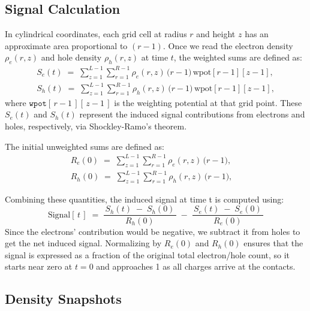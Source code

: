\subsection{Signal Calculation}
In cylindrical coordinates, each grid cell at radius $r$ and height $z$ has an approximate area proportional to $(r - 1)$. Once we read the electron 
density $\rho_e(r,z)$ and hole density $\rho_h(r,z)$ at time $t$, the weighted sums are defined as:
\begin{align}
S_e(t) \;=\; \sum_{z=1}^{L-1} \sum_{r=1}^{R-1}
   \rho_e(r,z)\,\bigl(r-1\bigr)\,\text{wpot}[r-1][z-1],\\
S_h(t) \;=\; \sum_{z=1}^{L-1} \sum_{r=1}^{R-1}
   \rho_h(r,z)\,\bigl(r-1\bigr)\,\text{wpot}[r-1][z-1],
\end{align}
where \(\texttt{wpot}[\,r-1\,][\,z-1\,]\) is the weighting potential at that grid 
point. These $S_e(t)$ and $S_h(t)$ represent the induced signal contributions 
from electrons and holes, respectively, via Shockley-Ramo’s theorem.

The initial unweighted sums are defined as:
\begin{align}
R_{e}(0) \;=\; \sum_{z=1}^{L-1} \sum_{r=1}^{R-1}
   \rho_e(r,z)\,\bigl(r-1\bigr), \quad \\
R_{h}(0) \;=\; \sum_{z=1}^{L-1} \sum_{r=1}^{R-1}
   \rho_h(r,z)\,\bigl(r-1\bigr), \quad
\end{align}

Combining these quantities, the induced signal at time t is computed using:
\begin{equation}
\text{Signal}[\,t\,] 
\;=\;
  \frac{\,S_h(t)\;-\;S_h(0)\,}{\,R_{h}(0)\,}
  \;-\;
  \frac{\,S_e(t)\;-\;S_e(0)\,}{\,R_{e}(0)\,}
\label{eq:net-signal}
\end{equation}
Since the electrons’ contribution would be negative, we subtract it from holes to get the net induced signal. Normalizing by $R_{e}(0)$ and $R_{h}(0)$ ensures that the signal is expressed as a fraction of the original total electron/hole count, so it starts near zero at $t=0$ and approaches 1 as all charges arrive at the contacts.

\subsection{Density Snapshots}


